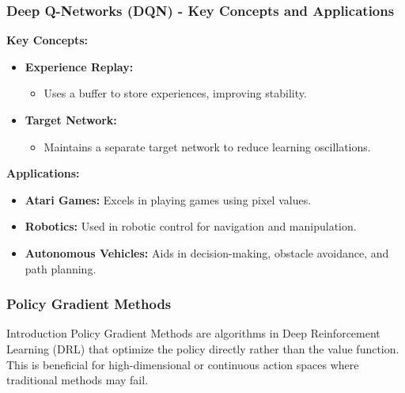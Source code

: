 \documentclass[aspectratio=169]{beamer}
\begin{document}
\begin{frame}[fragile]
    \frametitle{Deep Q-Networks (DQN) - Key Concepts and Applications}
    
    \textbf{Key Concepts:}
    \begin{itemize}
        \item \textbf{Experience Replay:}
        \begin{itemize}
            \item Uses a buffer to store experiences, improving stability.
        \end{itemize}

        \item \textbf{Target Network:}
        \begin{itemize}
            \item Maintains a separate target network to reduce learning oscillations.
        \end{itemize}
    \end{itemize}
    
    \textbf{Applications:}
    \begin{itemize}
        \item \textbf{Atari Games:} Excels in playing games using pixel values.
        \item \textbf{Robotics:} Used in robotic control for navigation and manipulation.
        \item \textbf{Autonomous Vehicles:} Aids in decision-making, obstacle avoidance, and path planning.
    \end{itemize}
\end{frame}

\begin{frame}
    \frametitle{Policy Gradient Methods}
    \begin{block}{Introduction}
        Policy Gradient Methods are algorithms in Deep Reinforcement Learning (DRL) that optimize the policy directly rather than the value function. 
        This is beneficial for high-dimensional or continuous action spaces where traditional methods may fail.
    \end{block}
\end{frame}
\end{document}

